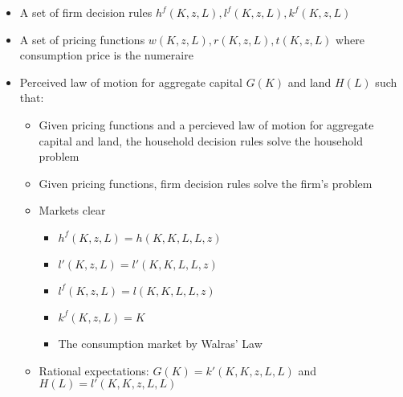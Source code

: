 \documentclass[answers]{exam}
\begin{document}
\begin{questions}
\begin{parts}
\begin{solution}
\begin{itemize}
            \item A set of firm decision rules $h^f(K,z,L), l^f(K,z,L), k^f(K,z,L)$
            \item A set of pricing functions $w(K,z,L), r(K,z,L), t(K,z,L)$ where consumption price is the numeraire
            \item Perceived law of motion for aggregate capital $G(K)$ and land $H(L)$ such that:
            \begin{itemize}
                \item Given pricing functions and a percieved law of motion for aggregate capital and land, the household decision rules solve the household problem
                \item Given pricing functions, firm decision rules solve the firm's problem
                \item Markets clear
                \begin{itemize}
                    \item $h^f(K,z,L) = h(K,K,L,L,z)$ 
                    \item $l'(K,z,L) = l'(K,K,L,L,z)$
                    \item $l^f(K,z,L) = l(K,K,L,L,z)$
                    \item $k^f(K,z,L) = K$
                    \item The consumption market by Walras' Law
                \end{itemize}
                \item Rational expectations: $G(K) = k'(K,K,z,L,L)$ and $H(L) = l'(K,K,z,L,L)$
            \end{itemize}
        \end{itemize}
    \end{solution}
\end{parts}
\end{questions}
\end{document}
